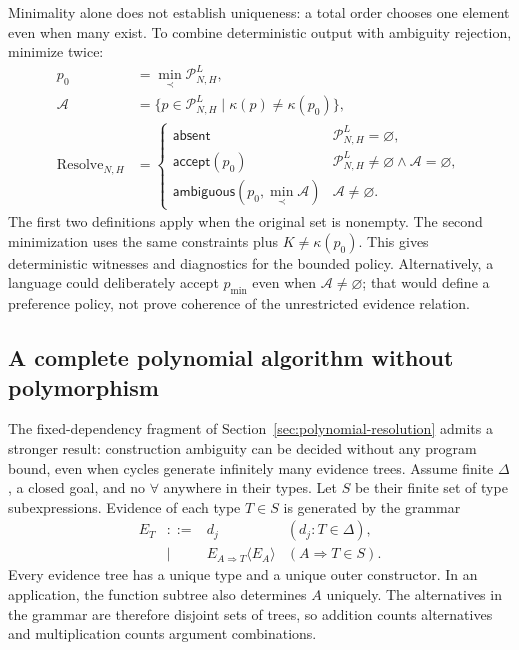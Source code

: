 \documentclass[10pt,a4paper]{article}
\newcommand{\iarg}[1]{\langle#1\rangle}
\begin{document}
Minimality alone does not establish uniqueness: a total order chooses one element
even when many exist. To combine deterministic output with ambiguity rejection,
minimize twice:
\[
\begin{aligned}
 p_0&=\min_{\prec}\mathcal P^L_{N,H},\\
 \mathcal A&=\{p\in\mathcal P^L_{N,H}\mid\kappa(p)\ne\kappa(p_0)\},\\
 \operatorname{Resolve}_{N,H}&=
 \begin{cases}
  \mathsf{absent}&\mathcal P^L_{N,H}=\varnothing,\\
  \mathsf{accept}(p_0)&\mathcal P^L_{N,H}\ne\varnothing\land\mathcal A=\varnothing,\\
  \mathsf{ambiguous}(p_0,\min_{\prec}\mathcal A)&\mathcal A\ne\varnothing.
 \end{cases}
\end{aligned}
\]
The first two definitions apply when the original set is nonempty. The second
minimization uses the same constraints plus $K\ne\kappa(p_0)$.
This gives deterministic witnesses and diagnostics for the bounded policy.
Alternatively, a language could deliberately accept $p_{\min}$ even when
$\mathcal A\ne\varnothing$; that would define a preference policy, not prove
coherence of the unrestricted evidence relation.

\newpage
\subsection{A complete polynomial algorithm without polymorphism}
\label{sec:ambiguity-finite-grammar}
The fixed-dependency fragment of Section~\ref{sec:polynomial-resolution} admits
a stronger result: construction ambiguity can be decided without any program
bound, even when cycles generate infinitely many evidence trees.
Assume finite $\Delta$, a closed goal, and no $\forall$ anywhere in their types.
Let $S$ be their finite set of type subexpressions. Evidence of each type
$T\in S$ is generated by the grammar
\[
\begin{array}{rcll}
 E_T&::=&d_j & (d_j:T\in\Delta),\\
    &\mid&E_{A\Rightarrow T}\iarg{E_A}&(A\Rightarrow T\in S).
\end{array}
\]
Every evidence tree has a unique type and a unique outer constructor.
In an application, the function subtree also determines $A$ uniquely.
The alternatives in the grammar are therefore disjoint sets of trees, so
addition counts alternatives and multiplication counts argument combinations.
\end{document}
